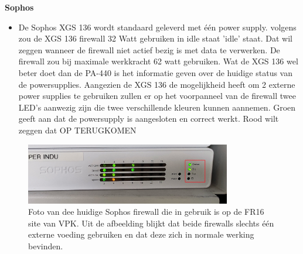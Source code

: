 \textbf{Sophos}
\begin{itemize}[label=\textbullet]
    \item De Sophos XGS 136 wordt standaard geleverd met één power supply. volgens \textcite{AccessNetworks2025} zou de XGS 136 firewall 32 Watt gebruiken in idle staat 'idle' staat. Dat wil zeggen wanneer de firewall niet actief bezig is met data te verwerken. De firewall zou bij maximale werkkracht 62 watt gebruiken. 
    Wat de XGS 136 wel beter doet dan de PA-440 is het informatie geven over de huidige status van de powersupplies. Aangezien de XGS 136 de mogelijkheid heeft om 2 externe power supplies te gebruiken zullen er op het voorpanneel van de firewall twee LED's aanwezig zijn die twee verschillende kleuren kunnen aannemen. Groen geeft aan dat de powersupply is aangesloten en correct werkt. Rood wilt zeggen dat OP TERUGKOMEN
\end{itemize}


\begin{table}[h!]
    \centering
    \caption{Statusinformatie voor Power adapter 1 en 2 op basis van LED kleur.}
\end{table}

\begin{figure}[H]
    \centering
    \includegraphics[width=0.8\textwidth]{fotos/SophosFirewall_LEDStatus.jpg}
    \caption[Sophos Firewall]{\label{fig:grail}Foto van dee huidige Sophos firewall die in gebruik is op de FR16 site van VPK. Uit de afbeelding blijkt dat beide firewalls slechts één externe voeding gebruiken en dat deze zich in normale werking bevinden.}
\end{figure} 



